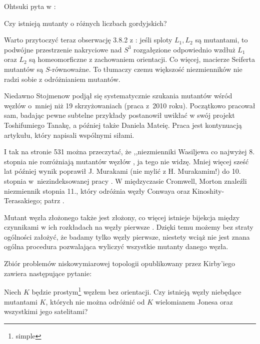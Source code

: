 Ohtsuki pyta w \cite[problem 12.15]{ohtsuki02}:

\begin{conjecture}
    Czy istnieją mutanty o różnych liczbach gordyjskich?
\end{conjecture}

Warto przytoczyć teraz obserwację 3.8.2 z \cite[s. 43]{kawauchi96}: jeśli sploty $L_1, L_2$ są mutantami, to podwójne przestrzenie nakryciowe nad $S^3$ rozgałęzione odpowiednio wzdłuż $L_1$ oraz $L_2$ są homeomorficzne z zachowaniem orientacji.
Co więcej, macierze Seiferta mutantów są $S$-równoważne.
To tłumaczy czemu większość niezmienników nie radzi sobie z odróżnianiem mutantów.

Niedawno Stojmenow podjął się systematycznie szukania mutantów wśród węzłów o~mniej niż 19 skrzyżowaniach (praca \cite{stoimenow10} z~2010 roku).
Początkowo pracował sam, badając pewne subtelne przykłady postanowił uwikłać w swój projekt Toshifumiego Tanakę, a później także Daniela Mateię.
Praca \cite{stoimenow10} jest kontynuacją artykułu, który napisali wspólnymi siłami.

I tak na stronie 531 można przeczytać, że ,,niezmienniki Wasiljewa co najwyżej 8. stopnia nie rozróżniają mutantów węzłów \cite{chmutov94}, ja tego nie widzę.
Mniej więcej sześć lat później wynik poprawił J. Murakami (nie mylić z H. Murakamim!) do 10. stopnia w~niezindeksowanej pracy \cite{murakami99}.
W międzyczasie Cromwell, Morton znaleźli niezmiennik stopnia 11., który odróżnia węzły Conwaya oraz Kinoshity-Terasakiego; patrz \cite{cromwell96}.

Mutant węzła złożonego także jest złożony, co więcej istnieje bijekcja między czynnikami w ich rozkładach na węzły pierwsze \cite{ruberman87}.
Dzięki temu możemy bez straty ogólności założyć, że badamy tylko węzły pierwsze, niestety wciąż nie jest znana ogólna procedura pozwalająca wyliczyć wszystkie mutanty danego węzła.

Zbiór problemów niskowymiarowej topologii opublikowany przez Kirby'iego \cite{kirby78} zawiera następujące pytanie:
\begin{conjecture}[problem 1.91]
    Niech $K$ będzie prostym\footnote{simple} węzłem bez orientacji.
    Czy istnieją węzły niebędące mutantami $K$, których nie można odróżnić od $K$ wielomianem Jonesa oraz wszystkimi jego satelitami?
\end{conjecture}

